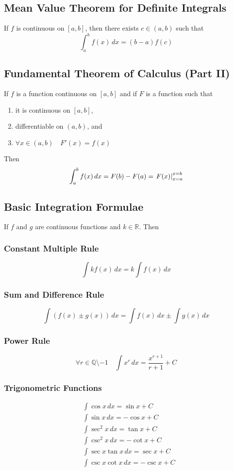 \documentclass[../ma2002_notes.tex]{subfiles}
\begin{document}
\subsection{Mean Value Theorem for Definite Integrals}
If \(f\) is continuous on \([a,b]\), then there exists \(c\in(a,b)\) such that
\[\int_a^bf(x)\,dx=(b-a)f(c)\]

\subsection{Fundamental Theorem of Calculus (Part II)}
If \(f\) is a function continuous on \([a,b]\) and if \(F\) is a function such that
\begin{enumerate}
	\item it is continuous on \([a,b]\),
	\item differentiable on \((a,b)\), and
	\item\(\forall x\in(a,b)\quad F'(x)=f(x)\)
\end{enumerate}
Then
\[\int_a^bf(x)\,dx=F(b)-F(a)=\left.F(x)\right|_{x=a}^{x=b}\]

\subsection{Basic Integration Formulae}
If \(f\) and \(g\) are continuous functions and \(k\in\mathbb{R}\). Then

\subsubsection{Constant Multiple Rule}
\[\int kf(x)\,dx=k\int f(x)\,dx\]

\subsubsection{Sum and Difference Rule}
\[\int(f(x)\pm g(x))\,dx=\int f(x)\,dx\pm\int g(x)\,dx\]

\subsubsection{Power Rule}
\[\forall r\in\mathbb{Q}\setminus{-1}\quad\int x^r\,dx=\frac{x^{r+1}}{r+1}+C\]

\subsubsection{Trigonometric Functions}
\begin{align*}
	&\int\cos x\,dx=\sin x+C\\
	&\int\sin x\,dx=-\cos x+C\\
	&\int\sec^2x\,dx=\tan x+C\\
	&\int\csc^2x\,dx=-\cot x+C\\
	&\int\sec x\tan x\,dx=\sec x+C\\
	&\int\csc x\cot x\,dx=-\csc x+C
\end{align*}
\end{document}
